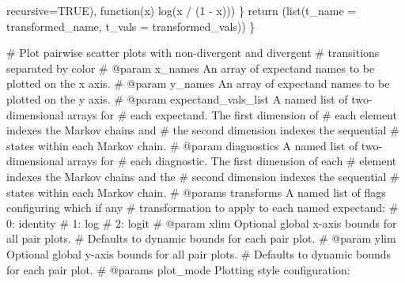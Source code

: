 \documentclass[
  letterpaper,
  DIV=11,
  numbers=noendperiod]{scrartcl}
\newenvironment{Shaded}{\begin{snugshade}}{\end{snugshade}}
\newcommand{\BuiltInTok}[1]{\textcolor[rgb]{0.00,0.23,0.31}{#1}}
\newcommand{\CommentTok}[1]{\textcolor[rgb]{0.37,0.37,0.37}{#1}}
\newcommand{\ControlFlowTok}[1]{\textcolor[rgb]{0.00,0.23,0.31}{#1}}
\newcommand{\DecValTok}[1]{\textcolor[rgb]{0.68,0.00,0.00}{#1}}
\newcommand{\NormalTok}[1]{\textcolor[rgb]{0.00,0.23,0.31}{#1}}
\newcommand{\OperatorTok}[1]{\textcolor[rgb]{0.37,0.37,0.37}{#1}}
\newcommand{\StringTok}[1]{\textcolor[rgb]{0.13,0.47,0.30}{#1}}
\begin{document}
\begin{Shaded}
\begin{Highlighting}[]
\NormalTok{                                 recursive}\OperatorTok{=}\NormalTok{TRUE),}
\NormalTok{                               function(x) log(x }\OperatorTok{/}\NormalTok{ (}\DecValTok{1} \OperatorTok{{-}}\NormalTok{ x)))}
\NormalTok{  \}}
  \ControlFlowTok{return}\NormalTok{ (}\BuiltInTok{list}\NormalTok{(}\StringTok{\textquotesingle{}t\_name\textquotesingle{}} \OperatorTok{=}\NormalTok{ transformed\_name, }
               \StringTok{\textquotesingle{}t\_vals\textquotesingle{}} \OperatorTok{=}\NormalTok{ transformed\_vals))}
\NormalTok{\}}
\end{Highlighting}
\end{Shaded}

\begin{Shaded}
\begin{Highlighting}[]
\CommentTok{\# Plot pairwise scatter plots with non{-}divergent and divergent }
\CommentTok{\# transitions separated by color}
\CommentTok{\# @param x\_names An array of expectand names to be plotted on the x axis.}
\CommentTok{\# @param y\_names An array of expectand names to be plotted on the y axis.}
\CommentTok{\# @param expectand\_vals\_list A named list of two{-}dimensional arrays for}
\CommentTok{\#                            each expectand.  The first dimension of}
\CommentTok{\#                            each element indexes the Markov chains and}
\CommentTok{\#                            the second dimension indexes the sequential}
\CommentTok{\#                            states within each Markov chain.}
\CommentTok{\# @param diagnostics A named list of two{-}dimensional arrays for }
\CommentTok{\#                    each diagnostic.  The first dimension of each}
\CommentTok{\#                    element indexes the Markov chains and the }
\CommentTok{\#                    second dimension indexes the sequential }
\CommentTok{\#                    states within each Markov chain.}
\CommentTok{\# @params transforms A named list of flags configuring which if any}
\CommentTok{\#                    transformation to apply to each named expectand:}
\CommentTok{\#                      0: identity}
\CommentTok{\#                      1: log}
\CommentTok{\#                      2: logit}
\CommentTok{\# @param xlim       Optional global x{-}axis bounds for all pair plots.}
\CommentTok{\#                   Defaults to dynamic bounds for each pair plot.}
\CommentTok{\# @param ylim       Optional global y{-}axis bounds for all pair plots.}
\CommentTok{\#                   Defaults to dynamic bounds for each pair plot.}
\CommentTok{\# @params plot\_mode Plotting style configuration: }

\end{Highlighting}
\end{Shaded}
\end{document}
